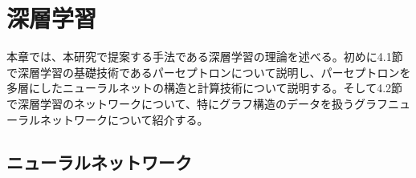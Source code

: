 
\chapter{深層学習} \label{sec:Deeplearning}
本章では、本研究で提案する手法である深層学習の理論を述べる。初めに4.1節で深層学習の基礎技術であるパーセプトロンについて説明し、パーセプトロンを多層にしたニューラルネットの構造と計算技術について説明する。そして4.2節で深層学習のネットワークについて、特にグラフ構造のデータを扱うグラフニューラルネットワークについて紹介する。
\section{ニューラルネットワーク}
